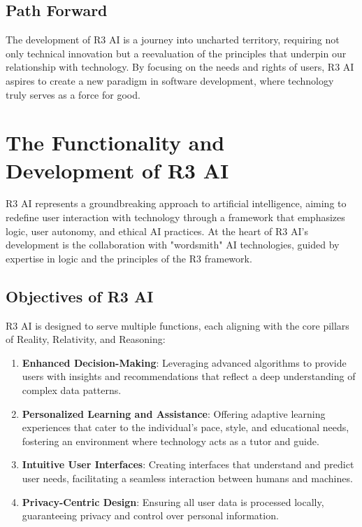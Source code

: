\documentclass[12pt]{article}
\begin{document}
\subsection*{Path Forward}

The development of R3 AI is a journey into uncharted territory, requiring not only technical innovation but a reevaluation of the principles that underpin our relationship with technology. By focusing on the needs and rights of users, R3 AI aspires to create a new paradigm in software development, where technology truly serves as a force for good.


\section{The Functionality and Development of R3 AI}

R3 AI represents a groundbreaking approach to artificial intelligence, aiming to redefine user interaction with technology through a framework that emphasizes logic, user autonomy, and ethical AI practices. At the heart of R3 AI's development is the collaboration with "wordsmith" AI technologies, guided by expertise in logic and the principles of the R3 framework.

\subsection{Objectives of R3 AI}

R3 AI is designed to serve multiple functions, each aligning with the core pillars of Reality, Relativity, and Reasoning:

\begin{enumerate}
    \item \textbf{Enhanced Decision-Making}: Leveraging advanced algorithms to provide users with insights and recommendations that reflect a deep understanding of complex data patterns.
    \item \textbf{Personalized Learning and Assistance}: Offering adaptive learning experiences that cater to the individual's pace, style, and educational needs, fostering an environment where technology acts as a tutor and guide.
    \item \textbf{Intuitive User Interfaces}: Creating interfaces that understand and predict user needs, facilitating a seamless interaction between humans and machines.
    \item \textbf{Privacy-Centric Design}: Ensuring all user data is processed locally, guaranteeing privacy and control over personal information.
\end{enumerate}
\end{document}
